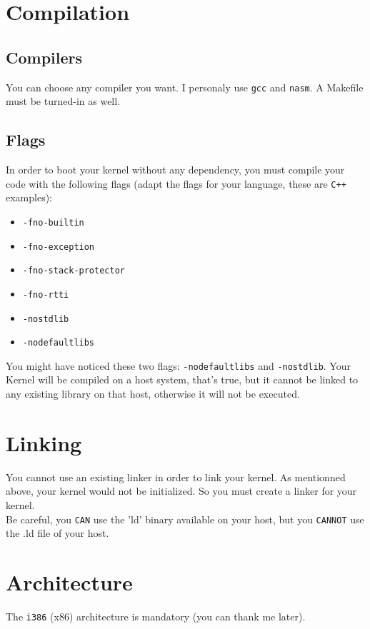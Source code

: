 \documentclass{42-en}
\begin{document}
    \section{Compilation}
        \subsection{Compilers}
            You can choose any compiler you want. I personaly use \texttt{gcc}
            and \texttt{nasm}. A Makefile must be turned-in as well.
        \subsection{Flags}
            In order to boot your kernel without any dependency, you must
            compile your code with the following flags (adapt the flags for
            your language, these are \texttt{C++} examples):
            \begin{itemize}\itemsep1pt
                \item \texttt{-fno-builtin}
                \item \texttt{-fno-exception}
                \item \texttt{-fno-stack-protector}
                \item \texttt{-fno-rtti}
                \item \texttt{-nostdlib}
                \item \texttt{-nodefaultlibs}
            \end{itemize}
            You might have noticed these two flags: \texttt{-nodefaultlibs}
            and \texttt{-nostdlib}. Your Kernel will be compiled on a host
            system, that's true, but it cannot be linked to any existing
            library on that host, otherwise it will not be executed.
    \section{Linking}
        You cannot use an existing linker in order to link your kernel.
        As mentionned above, your kernel would not be initialized. So you must
        create a linker for your kernel.\\
        Be careful, you \texttt{CAN} use the 'ld' binary available on your
        host, but you \texttt{CANNOT} use the .ld file of your host.
    \section{Architecture}
        The \texttt{i386} (x86) architecture is mandatory (you can thank
        me later).
\end{document}
